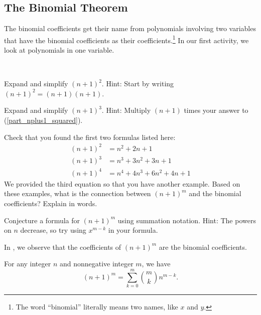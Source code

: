 \newcommand{\subbinomthm}{The Binomial Theorem}
\subsection{\subbinomthm}
\label{sub_binom_thm}

The binomial coefficients get their name from polynomials involving two variables that have the binomial coefficients as their coefficients.\footnote{The word ``binomial'' literally means two names, like $x$ and $y$.}  In our first activity, we look at polynomials in one variable.

\begin{act}[Powers of $n+1$]
\label{act_powers_nplus1}
~
    \begin{actpart}
        \item \label{part_nplus1_squared} Expand and simplify $(n+1)^2$.  
        Hint: Start by writing $(n+1)^2=(n+1)(n+1)$.
        \item 
        \label{part_nplus1_cubed} Expand and simplify $(n+1)^3$. Hint: Multiply $(n+1)$ times your answer to (\ref{part_nplus1_squared}).
            
        \item Check that you found the first two formulas listed here:
            \begin{align*}
                (n+1)^2 & =n^2+2n+1 \\
                (n+1)^3 & =n^3 +3n^2+3n+1 \\
                (n+1)^4 &=n^4+4n^3+6n^2+4n+1
            \end{align*} 
        We provided the third equation so that you have another example.  Based on these examples, what is the connection between $(n+1)^m$ and the binomial coefficients? Explain in words.
            
        \item Conjecture a formula for $(n+1)^m$ using summation notation. Hint: The powers on $n$ decrease, so try using $x^{m-k}$ in your formula.
    \end{actpart}
\end{act}

In , we observe that the coefficients of $(n+1)^m$ are the binomial coefficients. 

\begin{rem}
\label{rem_special_case_binomial_formula}
    For any integer $n$ and nonnegative integer $m$, we have
        $$(n+1)^m %
        = \sum_{k=0}^m \binom{m}{k}n^{m-k}.$$
\end{rem}

